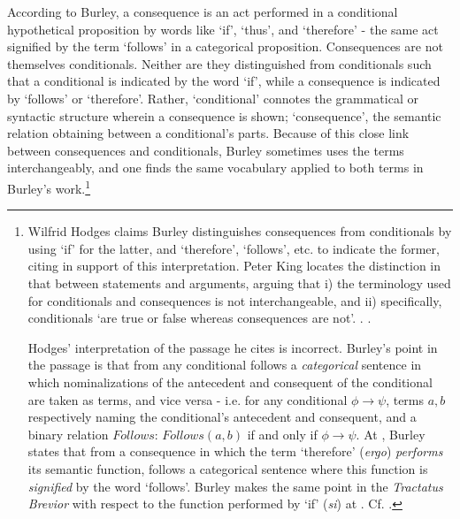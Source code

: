 	According to Burley, a consequence is an act performed in a conditional hypothetical proposition by words like `if', `thus', and `therefore' - the same act signified by the term `follows' in a categorical proposition. Consequences are not themselves conditionals. Neither are they distinguished from conditionals such that a conditional is indicated by the word `if', while a consequence is indicated by `follows' or `therefore'. Rather, `conditional' connotes the grammatical or syntactic structure wherein a consequence is shown; `consequence', the semantic relation obtaining between a conditional's parts. Because of this close link between consequences and conditionals, Burley sometimes uses the terms interchangeably, and one finds the same vocabulary applied to both terms in Burley's work.\footnote{Wilfrid Hodges claims Burley distinguishes consequences from conditionals by using `if' for the latter, and `therefore', `follows', etc. to indicate the former, citing \autocite[p. 78.10-20]{BurleyDPAL} in support of this interpretation. Peter King locates the distinction in that between statements and arguments, arguing that i) the terminology used for conditionals and consequences is not interchangeable, and ii) specifically, conditionals `are true or false whereas consequences are not'. \cite{HodgesBurley}. \cite[p. 120]{King2001}.
		
		Hodges' interpretation of the passage he cites is incorrect. Burley's point in the passage is that from any conditional follows a \textit{categorical} sentence in which nominalizations of the antecedent and consequent of the conditional are taken as terms, and vice versa - i.e. for any conditional $\phi \rightarrow \psi$, terms $a, b$ respectively naming the conditional's antecedent and consequent, and a binary relation $Follows$: $Follows(a, b)$ if and only if $\phi \rightarrow \psi$. At \autocite[p. 141.26-30]{BurleyDPAL}, Burley states that from a consequence in which the term `therefore' (\textit{ergo}) \textit{performs} its semantic function, follows a categorical sentence where this function is \textit{signified} by the word `follows'. Burley makes the same point in the \textit{Tractatus Brevior} with respect to the function performed by `if' (\textit{si}) at \autocite[p. 219.1-9]{BurleyDPAL}. Cf. \cite[p. 143, par. 119]{Green-Pedersen1980b}.
		
}
